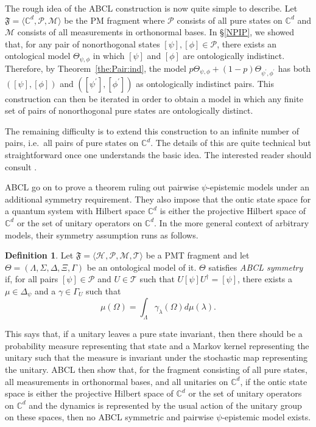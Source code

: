 \documentclass[DIV=calc,fontsize=12pt]{scrartcl} %
\theoremstyle{definition}
\newtheorem{definition}{Definition}[section]
\theoremstyle{plain}
\newcommand{\Proj}[1]{\ensuremath{\left [ #1 \right ]}}
\newcommand{\Hilb}[1][]{\ensuremath{\mathcal{H}_{#1}}}
\begin{document}
The rough idea of the ABCL construction is now quite simple to
describe.  Let $\mathfrak{F} = \langle \mathbb{C}^d, \mathcal{P},
\mathcal{M} \rangle$ be the PM fragment where $\mathcal{P}$ consists
of all pure states on $\mathbb{C}^d$ and $\mathcal{M}$ consists of all
measurements in orthonormal bases.  In \S\ref{NPIP}, we showed that,
for any pair of nonorthogonal states $\Proj{\psi}, \Proj{\phi} \in
\mathcal{P}$, there exists an ontological model $\Theta_{\psi,\phi}$ in
which $\Proj{\psi}$ and $\Proj{\phi}$ are ontologically indistinct.
Therefore, by Theorem~\ref{the:Pair:ind}, the model $p \Theta_{\psi,\phi}
+ (1-p) \Theta_{\psi^{\prime},\phi^{\prime}}$ has both $\left (
\Proj{\psi},\Proj{\phi} \right )$ and $\left ( \Proj{\psi^{\prime}},
\Proj{\phi^{\prime}}\right )$ as ontologically indistinct pairs.
This construction can then be iterated in order to obtain a model in
which any finite set of pairs of nonorthogonal pure states are
ontologically distinct.

The remaining difficulty is to extend this construction to an infinite
number of pairs, i.e.\ all pairs of pure states on $\mathbb{C}^d$.
The details of this are quite technical but straightforward once one
understands the basic idea.  The interested reader should consult
\cite{Aaronson2013}.

ABCL go on to prove a theorem ruling out pairwise $\psi$-epistemic
models under an additional symmetry requirement.  They also impose
that the ontic state space for a quantum system with Hilbert space
$\mathbb{C}^d$ is either the projective Hilbert space of
$\mathbb{C}^d$ or the set of unitary operators on $\mathbb{C}^d$.  In
the more general context of arbitrary models, their symmetry
assumption runs as follows.
\begin{definition}
Let $\mathfrak{F} = \langle \Hilb, \mathcal{P}, \mathcal{M},
\mathcal{T} \rangle$ be a PMT fragment and let $\Theta = (\Lambda,
\Sigma, \Delta, \Xi, \Gamma)$ be an ontological model of it.  $\Theta$
satisfies \emph{ABCL symmetry} if, for all pairs $\Proj{\psi} \in
\mathcal{P}$ and $U \in \mathcal{T}$ such that $U \Proj{\psi}
U^{\dagger} = \Proj{\psi}$, there exists a $\mu \in \Delta_{\psi}$
and a $\gamma \in \Gamma_{U}$ such that
\begin{equation}
\mu(\Omega) = \int_{\Lambda} \gamma_{\lambda}(\Omega) d \mu(\lambda).
\end{equation}
\end{definition}
This says that, if a unitary leaves a pure state invariant, then there
should be a probability measure representing that state and a Markov
kernel representing the unitary such that the measure is invariant
under the stochastic map representing the unitary.  ABCL then show
that, for the fragment consisting of all pure states, all measurements
in orthonormal bases, and all unitaries on $\mathbb{C}^d$, if the
ontic state space is either the projective Hilbert space of
$\mathbb{C}^d$ or the set of unitary operators on $\mathbb{C}^d$ and
the dynamics is represented by the usual action of the unitary group
on these spaces, then no ABCL symmetric and pairwise $\psi$-epistemic
model exists.
\end{document}
